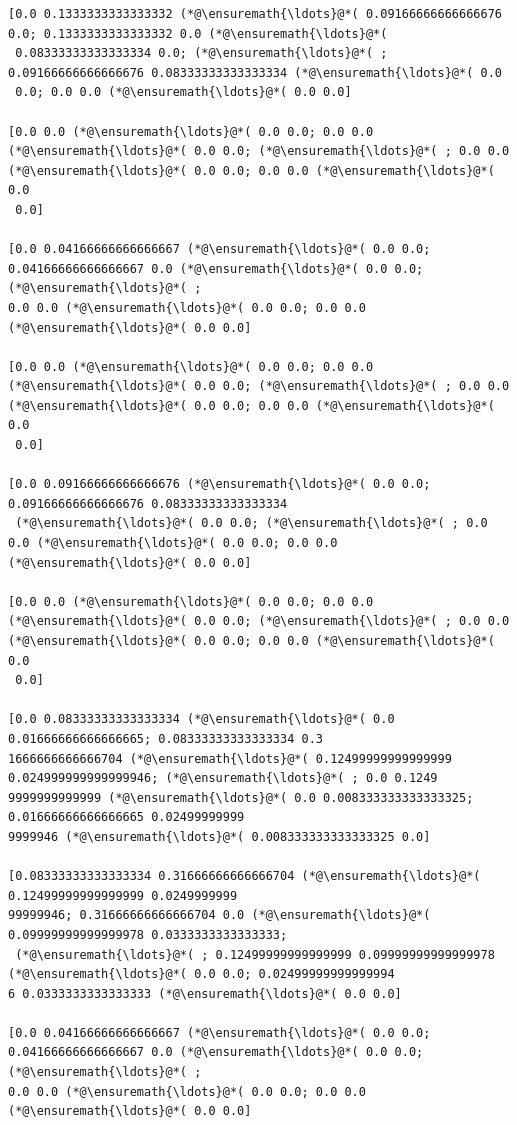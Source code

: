 \documentclass[12pt,a4paper]{article}
\begin{document}
\begin{lstlisting}
[0.0 0.1333333333333332 (*@\ensuremath{\ldots}@*( 0.09166666666666676 0.0; 0.1333333333333332 0.0 (*@\ensuremath{\ldots}@*(
 0.08333333333333334 0.0; (*@\ensuremath{\ldots}@*( ; 0.09166666666666676 0.08333333333333334 (*@\ensuremath{\ldots}@*( 0.0
 0.0; 0.0 0.0 (*@\ensuremath{\ldots}@*( 0.0 0.0]

[0.0 0.0 (*@\ensuremath{\ldots}@*( 0.0 0.0; 0.0 0.0 (*@\ensuremath{\ldots}@*( 0.0 0.0; (*@\ensuremath{\ldots}@*( ; 0.0 0.0 (*@\ensuremath{\ldots}@*( 0.0 0.0; 0.0 0.0 (*@\ensuremath{\ldots}@*( 0.0
 0.0]

[0.0 0.04166666666666667 (*@\ensuremath{\ldots}@*( 0.0 0.0; 0.04166666666666667 0.0 (*@\ensuremath{\ldots}@*( 0.0 0.0; (*@\ensuremath{\ldots}@*( ; 
0.0 0.0 (*@\ensuremath{\ldots}@*( 0.0 0.0; 0.0 0.0 (*@\ensuremath{\ldots}@*( 0.0 0.0]

[0.0 0.0 (*@\ensuremath{\ldots}@*( 0.0 0.0; 0.0 0.0 (*@\ensuremath{\ldots}@*( 0.0 0.0; (*@\ensuremath{\ldots}@*( ; 0.0 0.0 (*@\ensuremath{\ldots}@*( 0.0 0.0; 0.0 0.0 (*@\ensuremath{\ldots}@*( 0.0
 0.0]

[0.0 0.09166666666666676 (*@\ensuremath{\ldots}@*( 0.0 0.0; 0.09166666666666676 0.08333333333333334
 (*@\ensuremath{\ldots}@*( 0.0 0.0; (*@\ensuremath{\ldots}@*( ; 0.0 0.0 (*@\ensuremath{\ldots}@*( 0.0 0.0; 0.0 0.0 (*@\ensuremath{\ldots}@*( 0.0 0.0]

[0.0 0.0 (*@\ensuremath{\ldots}@*( 0.0 0.0; 0.0 0.0 (*@\ensuremath{\ldots}@*( 0.0 0.0; (*@\ensuremath{\ldots}@*( ; 0.0 0.0 (*@\ensuremath{\ldots}@*( 0.0 0.0; 0.0 0.0 (*@\ensuremath{\ldots}@*( 0.0
 0.0]

[0.0 0.08333333333333334 (*@\ensuremath{\ldots}@*( 0.0 0.01666666666666665; 0.08333333333333334 0.3
1666666666666704 (*@\ensuremath{\ldots}@*( 0.12499999999999999 0.024999999999999946; (*@\ensuremath{\ldots}@*( ; 0.0 0.1249
9999999999999 (*@\ensuremath{\ldots}@*( 0.0 0.008333333333333325; 0.01666666666666665 0.02499999999
9999946 (*@\ensuremath{\ldots}@*( 0.008333333333333325 0.0]

[0.08333333333333334 0.31666666666666704 (*@\ensuremath{\ldots}@*( 0.12499999999999999 0.0249999999
99999946; 0.31666666666666704 0.0 (*@\ensuremath{\ldots}@*( 0.09999999999999978 0.0333333333333333;
 (*@\ensuremath{\ldots}@*( ; 0.12499999999999999 0.09999999999999978 (*@\ensuremath{\ldots}@*( 0.0 0.0; 0.02499999999999994
6 0.0333333333333333 (*@\ensuremath{\ldots}@*( 0.0 0.0]

[0.0 0.04166666666666667 (*@\ensuremath{\ldots}@*( 0.0 0.0; 0.04166666666666667 0.0 (*@\ensuremath{\ldots}@*( 0.0 0.0; (*@\ensuremath{\ldots}@*( ; 
0.0 0.0 (*@\ensuremath{\ldots}@*( 0.0 0.0; 0.0 0.0 (*@\ensuremath{\ldots}@*( 0.0 0.0]


\end{lstlisting}
\end{document}
